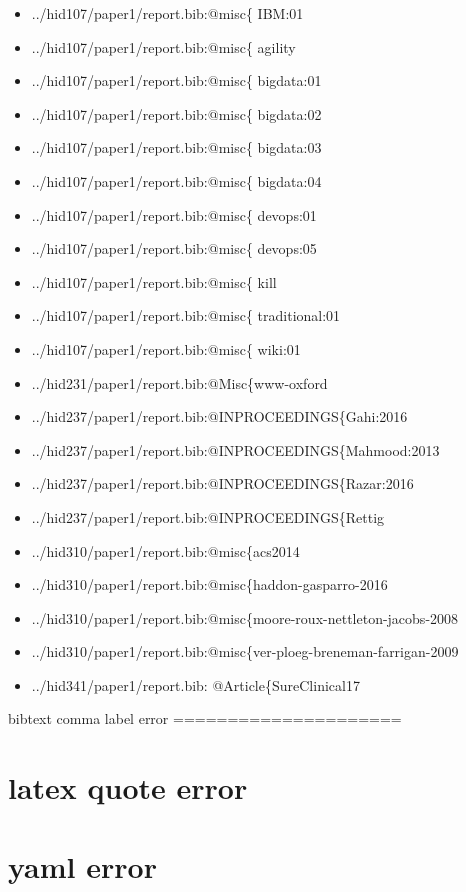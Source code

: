\begin{itemize}
\tightlist
\item
  ../hid107/paper1/report.bib:@misc\{ IBM:01
\item
  ../hid107/paper1/report.bib:@misc\{ agility
\item
  ../hid107/paper1/report.bib:@misc\{ bigdata:01
\item
  ../hid107/paper1/report.bib:@misc\{ bigdata:02
\item
  ../hid107/paper1/report.bib:@misc\{ bigdata:03
\item
  ../hid107/paper1/report.bib:@misc\{ bigdata:04
\item
  ../hid107/paper1/report.bib:@misc\{ devops:01
\item
  ../hid107/paper1/report.bib:@misc\{ devops:05
\item
  ../hid107/paper1/report.bib:@misc\{ kill
\item
  ../hid107/paper1/report.bib:@misc\{ traditional:01
\item
  ../hid107/paper1/report.bib:@misc\{ wiki:01
\item
  ../hid231/paper1/report.bib:@Misc\{www-oxford
\item
  ../hid237/paper1/report.bib:@INPROCEEDINGS\{Gahi:2016
\item
  ../hid237/paper1/report.bib:@INPROCEEDINGS\{Mahmood:2013
\item
  ../hid237/paper1/report.bib:@INPROCEEDINGS\{Razar:2016
\item
  ../hid237/paper1/report.bib:@INPROCEEDINGS\{Rettig
\item
  ../hid310/paper1/report.bib:@misc\{acs2014
\item
  ../hid310/paper1/report.bib:@misc\{haddon-gasparro-2016
\item
  ../hid310/paper1/report.bib:@misc\{moore-roux-nettleton-jacobs-2008
\item
  ../hid310/paper1/report.bib:@misc\{ver-ploeg-breneman-farrigan-2009
\item
  ../hid341/paper1/report.bib: @Article\{SureClinical17
\end{itemize}

bibtext comma label error =====================

\section{latex quote error}\label{latex-quote-error}

\section{yaml error}\label{yaml-error}

